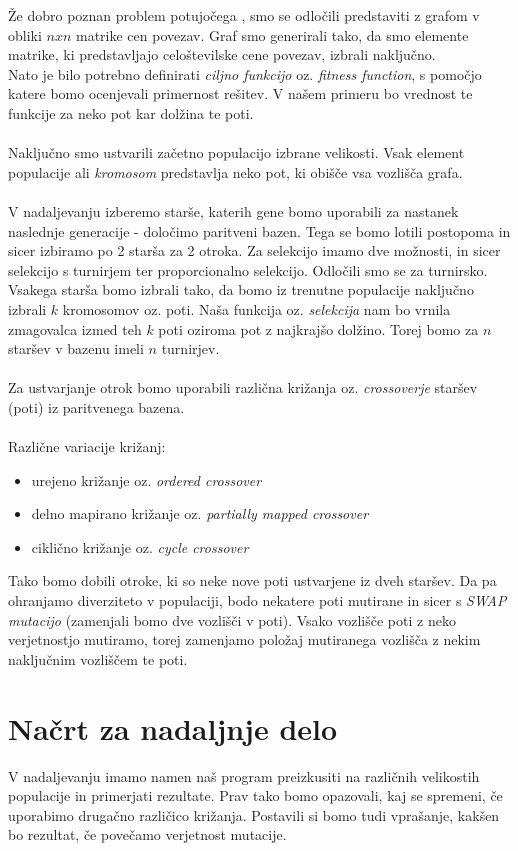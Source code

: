 \documentclass[a4paper]{article}
\begin{document}
Že dobro poznan problem potujočega , smo se odločili predstaviti z grafom v obliki $n x n$ matrike cen povezav. Graf smo generirali tako, da smo elemente matrike, ki predstavljajo celoštevilske cene povezav, izbrali naključno. 
\\
Nato je bilo potrebno definirati \textit{ciljno funkcijo} oz. \textit{fitness function}, s pomočjo katere bomo ocenjevali primernost rešitev. V našem primeru bo vrednost te funkcije za neko pot kar dolžina te poti.
\\
\\
Naključno smo ustvarili začetno populacijo izbrane velikosti. Vsak element populacije ali \textit{kromosom} predstavlja neko pot, ki obišče vsa vozlišča grafa. 
\\
\\
V nadaljevanju izberemo starše, katerih gene bomo uporabili za nastanek naslednje generacije - določimo paritveni bazen. Tega se bomo lotili postopoma in sicer izbiramo po 2 starša za 2 otroka. Za selekcijo imamo dve možnosti, in sicer selekcijo s turnirjem ter proporcionalno selekcijo. Odločili smo se za turnirsko. Vsakega starša bomo izbrali tako, da bomo iz trenutne populacije naključno izbrali  $k$ kromosomov oz. poti. Naša funkcija oz. \textit{selekcija} nam bo vrnila zmagovalca izmed teh  $k$ poti oziroma pot z najkrajšo dolžino. Torej bomo za $n$ staršev v bazenu imeli $n$ turnirjev.
\\
\\
Za ustvarjanje otrok bomo uporabili različna križanja oz. \textit{crossoverje} staršev (poti) iz paritvenega bazena.
\\
\\
Različne variacije križanj:
 \begin{itemize}

\item urejeno križanje oz. \textit{ordered crossover}
\item delno mapirano križanje oz.\textit{ partially mapped crossover}
\item ciklično križanje oz. \textit{cycle crossover}

 \end{itemize}
Tako bomo dobili otroke, ki so neke nove poti ustvarjene iz dveh staršev. Da pa ohranjamo diverziteto v populaciji, bodo nekatere poti mutirane in sicer s \textit{SWAP mutacijo} (zamenjali bomo dve vozlišči v poti). Vsako vozlišče poti z neko verjetnostjo mutiramo, torej zamenjamo položaj mutiranega vozlišča z nekim naključnim vozliščem te poti. 

\newpage
\section{Načrt za nadaljnje delo}

V nadaljevanju imamo namen naš program preizkusiti na različnih velikostih populacije in primerjati rezultate. Prav tako bomo opazovali, kaj se spremeni, če uporabimo drugačno različico križanja. Postavili si bomo tudi vprašanje, kakšen bo rezultat, če povečamo verjetnost mutacije. 
\end{document}

